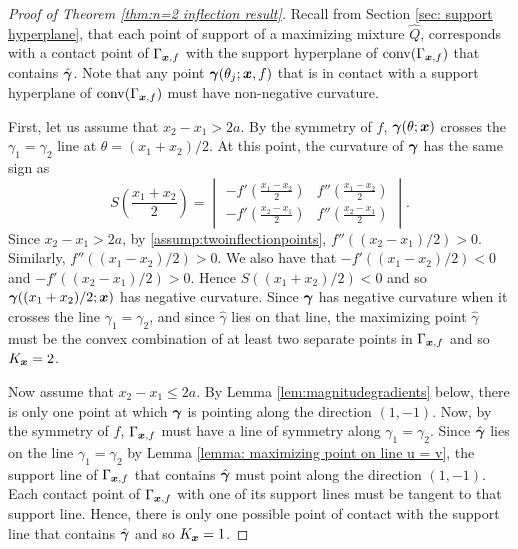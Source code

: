 \begin{proof}[Proof of Theorem \ref{thm:n=2 inflection result}]
			Recall from Section \ref{sec: support hyperplane}, that each point of support of a maximizing mixture $\hat{Q}$, corresponds with a contact point of $\Gamma_{{\bm{{x}}}, f}$ with the support hyperplane of $\mathrm{conv}(\Gamma_{{\bm{{x}}}, f})$ that contains $\hat{{\bm{{\gamma}}}}$. Note that any point ${\bm{{\gamma}}}(\theta_j;{\bm{{x}}},f)$ that is in contact with a support hyperplane of $\mathrm{conv}(\Gamma_{{\bm{{x}}}, f})$ must have non-negative curvature.

			First, let us assume that $x_2 - x_1 > 2a$. By the symmetry of $f$, ${\bm{{\gamma}}}(\theta;{\bm{{x}}})$ crosses the $\gamma_1 = \gamma_2$ line at $\theta = (x_1 + x_2)/2$. At this point, the curvature of ${\bm{{\gamma}}}$ has the same sign as
			\begin{equation}
				S\left(\frac{x_1+x_2}{2}\right) = 
				\begin{vmatrix}
					-f'(\frac{x_1 - x_2}{2}) & f''(\frac{x_1 - x_2}{2})\\
					-f'(\frac{x_2 - x_1}{2}) & f''(\frac{x_2 - x_1}{2})
				\end{vmatrix}.
			\end{equation}
			Since $x_2 - x_1 > 2a$, by \ref{assump:twoinflectionpoints},  $f''((x_2 - x_1)/2)>0$. Similarly, $f''((x_1 - x_2)/2) > 0$. We also have that $-f'((x_1 - x_2)/2) < 0$ and $-f'((x_2 - x_1)/2) > 0$. Hence $S((x_1 + x_2)/2)<0$ and so ${\bm{{\gamma}}}((x_1 + x_2)/2;{\bm{{x}}})$ has negative curvature. Since ${\bm{{\gamma}}}$ has negative curvature when it crosses the line $\gamma_1 = \gamma_2$, and since $\hat{\gamma}$ lies on that line, the maximizing point $\hat{\gamma}$ must be the convex combination of at least two separate points in $\Gamma_{{\bm{{x}}},f}$ and so $K_{\bm{{x}}} = 2$.

			
			Now assume that $x_2 - x_1 \leq 2a$. By Lemma \ref{lem:magnitudegradients} below, there is only one point at which ${\bm{{\gamma}}}$ is pointing along the direction $(1,-1)$. Now, by the symmetry of $f$, $\Gamma_{{\bm{{x}}}, f}$ must have a line of symmetry along $\gamma_1 = \gamma_2$. Since $\hat{{\bm{{\gamma}}}}$ lies on the line $\gamma_1 = \gamma_2$ by Lemma \ref{lemma: maximizing point on line u = v}, the support line of $\Gamma_{{\bm{{x}}},f}$ that contains $\hat{{\bm{{\gamma}}}}$ must point along the direction $(1, -1)$. Each contact point of $\Gamma_{{\bm{{x}}}, f}$ with one of its support lines must be tangent to that support line. Hence, there is only one possible point of contact with the support line that contains $\hat{{\bm{{\gamma}}}}$ and so $K_{\bm{{x}}} = 1$.


\end{proof}
